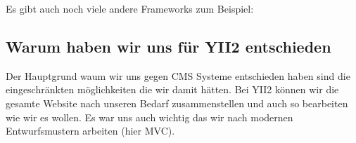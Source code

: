 Es gibt auch noch viele andere Frameworks zum Beispiel:

\subsection{Warum haben wir uns für YII2 entschieden}

Der Hauptgrund waum wir uns gegen CMS Systeme entschieden haben sind die eingeschränkten möglichkeiten die wir damit hätten. Bei YII2 können wir die gesamte Website nach unseren Bedarf zusammenstellen und auch so bearbeiten wie wir es wollen. Es war uns auch wichtig das wir nach modernen Entwurfsmustern arbeiten (hier MVC).